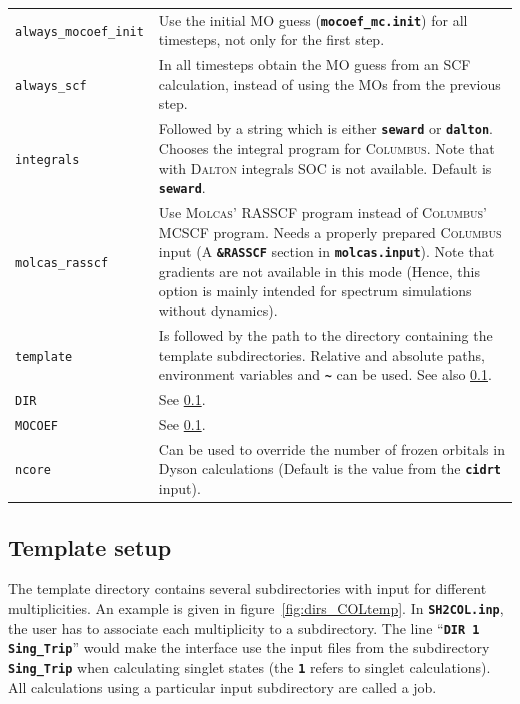 \documentclass[a4paper,11pt,DIV=15,openany,twoside=false]{scrbook}
\newcommand{\ttt}[1]{\textbf{\texttt{#1}}}
\begin{document}
\begin{longtable}{>{\tt}lp{12cm}}
always\_mocoef\_init    &Use the initial MO guess (\ttt{mocoef\_mc.init}) for all timesteps, not only for the first step.\\
always\_scf     &In all timesteps obtain the MO guess from an SCF calculation, instead of using the MOs from the previous step.\\
integrals       &Followed by a string which is either \ttt{seward} or \ttt{dalton}. Chooses the integral program for \textsc{Columbus}. Note that with \textsc{Dalton} integrals SOC is not available. Default is \ttt{seward}.\\
molcas\_rasscf  &Use \textsc{Molcas}' RASSCF program instead of \textsc{Columbus}' MCSCF program. Needs a properly prepared \textsc{Columbus} input (A \ttt{\&RASSCF} section in \ttt{molcas.input}). Note that gradients are not available in this mode (Hence, this option is mainly intended for spectrum simulations without dynamics).\\
template        &Is followed by the path to the directory containing the template subdirectories. Relative and absolute paths, environment variables and \ttt{\textasciitilde} can be used. See also \ref{int:col:template}.\\
DIR             &See \ref{int:col:template}.\\
MOCOEF          &See \ref{int:col:template}.\\
ncore           &Can be used to override the number of frozen orbitals in Dyson calculations (Default is the value from the \ttt{cidrt} input).\\
\end{longtable}



\subsection{Template setup}\label{int:col:template}

The template directory contains several subdirectories with input for different multiplicities. An example is given in figure~\ref{fig:dirs_COLtemp}. In \ttt{SH2COL.inp}, the user has to associate each multiplicity to a subdirectory. The line ``\ttt{DIR 1 Sing\_Trip}'' would make the interface use the input files from the subdirectory \ttt{Sing\_Trip} when calculating singlet states (the \ttt{1} refers to singlet calculations). All calculations using a particular input subdirectory are called a job.
\end{document}
